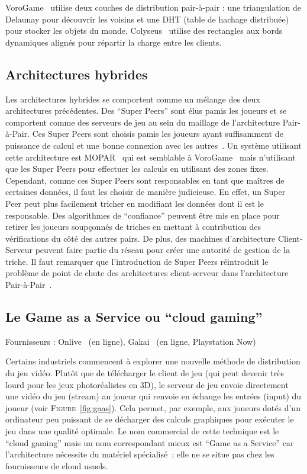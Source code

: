 VoroGame~\cite{vorogame} utilise deux couches de distribution pair-à-pair : une triangulation de Delaunay pour découvrir les voisins et une DHT (table de hachage distribuée) pour stocker les objets du monde. Colyseus~\cite{colyseus} utilise des rectangles aux bords dynamiques alignés pour répartir la charge entre les clients.

\subsection{Architectures hybrides}
Les architectures hybrides se comportent comme un mélange des deux architectures précédentes. Des ``Super Peers'' sont élus pamis les joueurs et se comportent comme des serveurs de jeu au sein du maillage de l'architecture Pair-à-Pair. Ces Super Peers sont choisis pamis les joueurs ayant suffisamment de puissance de calcul et une bonne connexion avec les autres~\cite{super_peer_network}. Un système utilisant cette architecture est MOPAR~\cite{MOPAR} qui est semblable à VoroGame~\cite{vorogame} mais n'utilisant que les Super Peers pour effectuer les calculs en utilisant des zones fixes.\\

Cependant, comme ces Super Peers sont responsables en tant que maîtres de certaines données, il faut les choisir de manière judicieuse. En effet, un Super Peer peut plus facilement tricher en modifiant les données dont il est le responsable. Des algorithmes de ``confiance'' peuvent être mis en place pour retirer les joueurs soupçonnés de triches en mettant à contribution des vérifications du côté des autres pairs. De plus, des machines d'architecture Client-Serveur peuvent faire partie du réseau pour créer une autorité de gestion de la triche. Il faut remarquer que l'introduction de Super Peers réintroduit le problème de point de chute des architectures client-serveur dans l'architecture Pair-à-Pair~\cite{design_issues_for_p2p_mmog}.

\subsection{Le Game as a Service ou ``cloud gaming''}
\begin{desc}
Fournisseurs : Onlive~\cite{onlive} (en ligne),  Gakai~\cite{gakai} (en ligne, Playstation Now)
\end{desc}
Certains industriels commencent à explorer une nouvelle méthode de distribution du jeu vidéo. Plutôt que de télécharger le client de jeu (qui peut devenir très lourd pour les jeux photoréalistes en 3D), le serveur de jeu envoie directement une vidéo du jeu (stream) au joueur qui renvoie en échange les entrées (input) du joueur (voir \textsc{Figure}~\ref{fig:gaas}). Cela permet, par exemple, aux joueurs dotés d'un ordinateur peu puissant de se décharger des calculs graphiques pour exécuter le jeu dans une qualité optimale. Le nom commercial de cette technique est le ``cloud gaming'' mais un nom correspondant mieux est ``Game as a Service'' car l'architecture nécessite du matériel spécialisé~: elle ne se situe pas chez les fournisseurs de cloud usuels.\\

